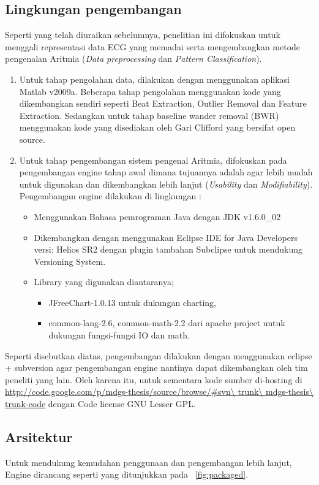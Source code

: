 \subsection{Lingkungan pengembangan}
Seperti yang telah diuraikan sebelumnya, penelitian ini difokuskan untuk
menggali representasi data ECG yang memadai serta mengembangkan metode
pengenalan Aritmia (\emph{Data preprocessing} dan \emph{Pattern
Classification}). 
\begin{enumerate}
  \item Untuk tahap pengolahan data, dilakukan dengan menggunakan aplikasi
  Matlab v2009a. Beberapa tahap pengolahan menggunakan kode yang
  dikembangkan sendiri seperti Beat Extraction, Outlier Removal dan
  Feature Extraction. Sedangkan untuk tahap baseline wander removal (BWR)
  menggunakan kode yang disediakan oleh Gari Clifford \cite{Clifford:2005} yang
  bersifat open source.
  \item Untuk tahap pengembangan sistem pengenal Aritmia, difokuskan pada
  pengembangan engine tahap awal dimana tujuannya adalah agar lebih mudah untuk
  digunakan dan dikembangkan lebih lanjut (\emph{Usability} dan
  \emph{Modifiability}). Pengembangan engine dilakukan di lingkungan :
  \begin{itemize}
    \item Menggunakan Bahasa pemrograman Java dengan JDK v1.6.0\_02
    \item Dikembangkan dengan menggunakan Eclipse IDE for Java Developers
    versi: Helios SR2 dengan plugin tambahan Subclipse untuk mendukung
    Versioning System.
    \item Library yang digunakan diantaranya;
    \begin{itemize}
      \item JFreeChart-1.0.13 untuk dukungan charting, 
      \item common-lang-2.6, common-math-2.2 dari apache project untuk dukungan
      fungsi-fungsi IO dan math.
	\end{itemize}
  \end{itemize}
\end{enumerate}
Seperti disebutkan diatas, pengembangan dilakukan dengan menggunakan eclipse +
subversion agar pengembangan engine nantinya dapat dikembangkan oleh tim
peneliti yang lain. Oleh karena itu, untuk sementara kode sumber di-hosting di
\url{http://code.google.com/p/mdgs-thesis/source/browse/#svn\ trunk\
mdgs-thesis\ trunk-code} dengan Code license GNU Lesser GPL.

\subsection{Arsitektur}
Untuk mendukung kemudahan penggunaan dan pengembangan lebih lanjut, Engine
dirancang seperti yang ditunjukkan pada \pic~\ref{fig:packaged}.

